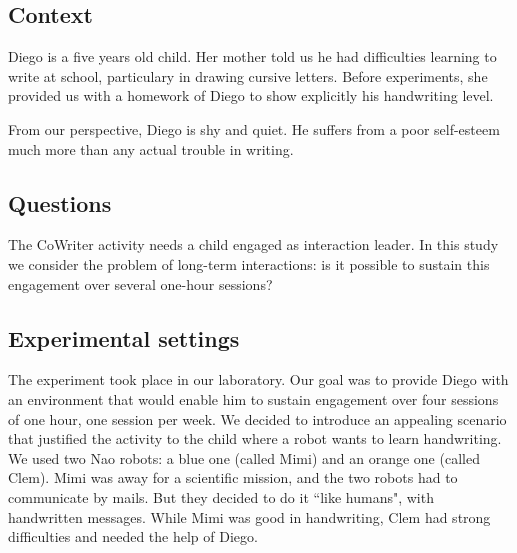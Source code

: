\documentclass{sig-alternate}
\begin{document}
\subsection{Context}
Diego is a five years old child. Her mother told us he had difficulties learning
to write at school, particulary in drawing cursive letters. Before experiments,
she provided us with a homework of Diego to show explicitly his handwriting
level. 

From our perspective, Diego is shy and quiet. He suffers from a poor
self-esteem much more than any actual trouble in writing.

\subsection{Questions}

The CoWriter activity needs a child engaged as interaction leader. 
In this study we consider the problem of long-term interactions: is it possible to
sustain this engagement over several one-hour sessions?

%

\subsection{Experimental settings}

The experiment took place in our laboratory. Our goal was to provide Diego with
an environment that would enable him to sustain engagement over four sessions 
of one hour, one session per week. We decided 
to introduce an appealing scenario that justified the activity to the child
where a robot wants to learn handwriting. We used two Nao robots: a blue one 
(called Mimi) and an orange one (called Clem). Mimi was away for a 
scientific mission, and the two robots had to communicate by mails. But they decided to do it 
``like humans", with handwritten messages. While Mimi was good in handwriting, 
Clem had strong difficulties and needed the help of Diego.
\end{document}
